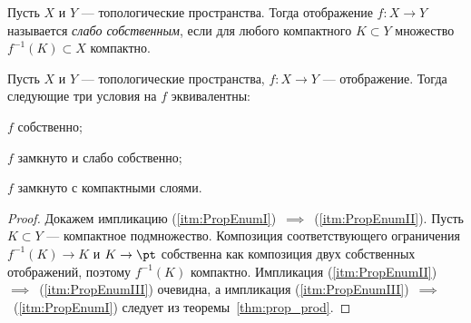 \documentclass[
	extrafontsizes,
	11pt,
	hyphens,
]{memoir}
\begin{document}
\begin{definition}
Пусть \(X\) и \(Y\) --- топологические пространства.
Тогда отображение \(f : X \to Y\) называется \emph{слабо собственным}, если для любого компактного \(K \subset Y\) множество \(f^{-1}(K) \subset X\) компактно.
\end{definition}

\begin{theorem}
\label{thm:layers_prop}
Пусть \(X\) и \(Y\) --- топологические пространства,
\(f : X \to Y\) --- отображение.
Тогда следующие три условия на \(f\) эквивалентны:
\begin{enumerate*}[
	font=\upshape,
	label=(\asbuk*),
	ref=\asbuk*,
	]
\item \label{itm:PropEnumI} \(f\) собственно;
\item \label{itm:PropEnumII} \(f\) замкнуто и слабо собственно;
\item \label{itm:PropEnumIII} \(f\) замкнуто с компактными слоями.
\end{enumerate*}
\end{theorem}

\begin{proof}
Докажем импликацию (\ref{itm:PropEnumI})~\({\implies}\)~(\ref{itm:PropEnumII}).
Пусть \(K \subset Y\) --- компактное подмножество.
Композиция соответствующего ограничения
\(f^{-1}(K) \to K\) и \(K \to \pt\) собственна как композиция двух собственных отображений, поэтому \(f^{-1}(K)\) компактно.
Импликация (\ref{itm:PropEnumII})~\({\implies}\)~(\ref{itm:PropEnumIII}) очевидна,
а импликация (\ref{itm:PropEnumIII})~\({\implies}\)~(\ref{itm:PropEnumI}) следует из теоремы~\ref{thm:prop_prod}.
\end{proof}

%
\end{document}
